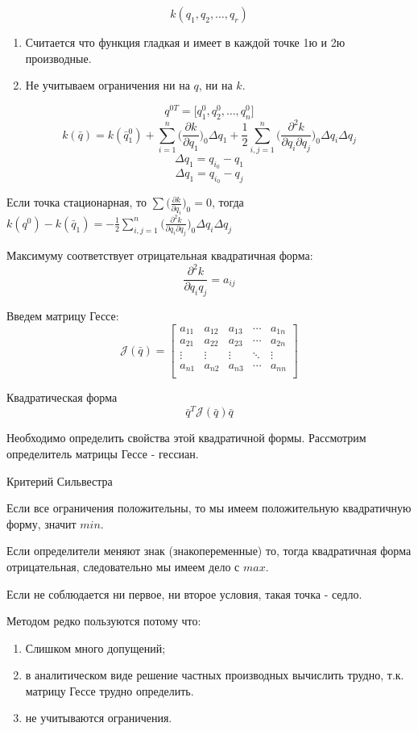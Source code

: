 \documentclass[12pt,a5paper]{scrbook}
\begin{document}
  $$k(q_1, q_2, \ldots, q_r)$$
  \begin{enumerate}
  	\item Считается что функция гладкая и имеет в каждой точке 1ю и 2ю производные.
  	\item Не учитываем ограничения ни на $q$, ни на $k$.
  \end{enumerate}
  $$q^{0T} = \Big[q_1^0, q_2^0, \ldots, q_n^0\Big]$$
  $$k(\bar{q}) = k(\bar{q}^0_1) + \sum_{i = 1}^n\Bigg(\frac{\partial k}{\partial q_1}\Bigg)_0\Delta q_1 + \frac{1}{2}\sum^n_{i, j = 1}\Bigg(\frac{\partial^2 k}{\partial q_i\partial q_j}\Bigg)_0\Delta q_i\Delta q_j$$
  $$\Delta q_1 = q_{i_0} - q_1$$
  $$\Delta q_1 = q_{i_0} - q_j$$
  \par
  Если точка стационарная, то $\sum\Big(\frac{\partial k}{\partial q_i}\Big)_0 = 0$, тогда\\$k(q^0) - k(\bar{q}_1) = - \frac{1}{2}\sum_{i, j = 1}^n\Big(\frac{\partial^2k}{\partial q_i\partial q_j}\Big)_0 \Delta q_i\Delta q_j$
  \par
  Максимуму соответствует отрицательная квадратичная форма:
  $$\frac{\partial^2k}{\partial q_i q_j} = a_{ij}$$
  \par
  Введем матрицу Гессе:
  $$
  	\mathcal{J}(\bar{q}) =
  	\begin{bmatrix}
  	  a_{11} & a_{12} & a_{13} & \cdots & a_{1n}\\
  	  a_{21} & a_{22} & a_{23} & \cdots & a_{2n}\\
  	  \vdots & \vdots & \vdots & \ddots & \vdots\\
  	  a_{n1} & a_{n2} & a_{n3} & \cdots & a_{nn}\\
  	\end{bmatrix}
  $$
  \par
  Квадратическая форма
  $$\bar{q}^T\mathcal{J}(\bar{q})\bar{q}$$
  \par
  Необходимо определить свойства этой квадратичной формы. Рассмотрим определитель матрицы Гессе - гессиан.
  \par
  Критерий Сильвестра
  \par
  Если все ограничения положительны, то мы имеем положительную квадратичную форму, значит $min$.
  \par
  Если определители меняют знак (знакопеременные) то, тогда квадратичная форма отрицательная, следовательно мы имеем дело с $max$.
  \par
  Если не соблюдается ни первое, ни второе условия, такая точка - седло.
  \par
  Методом редко пользуются потому что:
  \begin{enumerate}
  	\item Слишком много допущений;
  	\item в аналитическом виде решение частных производных вычислить трудно, т.к. матрицу Гессе трудно определить.
  	\item не учитываются ограничения.
  \end{enumerate}
\end{document}

